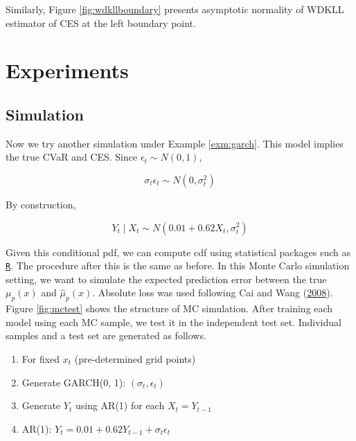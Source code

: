 \documentclass[
]{article}
\providecommand{\tightlist}{%
  \setlength{\itemsep}{0pt}\setlength{\parskip}{0pt}}
\theoremstyle{definition}
\theoremstyle{definition}
\theoremstyle{definition}
\theoremstyle{remark}
\begin{document}
Similarly, Figure \ref{fig:wdkllboundary} presents asymptotic normality of WDKLL estimator of CES at the left boundary point.

\hypertarget{experiment}{%
\section{Experiments}\label{experiment}}

\hypertarget{simulation}{%
\subsection{Simulation}\label{simulation}}

Now we try another simulation under Example \ref{exm:garch}. This model implies the true CVaR and CES. Since \(\epsilon_t \sim N(0, 1)\),

\begin{equation}
  \sigma_t \epsilon_t \sim N(0, \sigma_t^2)
  \label{eq:garchterm}
\end{equation}

By construction,

\begin{equation}
  Y_t \mid X_t \sim N \left( 0.01 + 0.62 X_t, \sigma_t^2 \right)
  \label{eq:arterm}
\end{equation}

Given this conditional pdf, we can compute cdf using statistical packages such as \href{https://www.r-project.org}{\texttt{R}}. The procedure after this is the same as before. In this Monte Carlo simulation setting, we want to simulate the expected prediction error between the true \(\mu_p(x)\) and \(\hat\mu_p(x)\). Absolute loss was used following Cai and Wang (\protect\hyperlink{ref-cai:2008aa}{2008}). Figure \ref{fig:mctest} shows the structure of MC simulation. After training each model using each MC sample, we test it in the independent test set. Individual samples and a test set are generated as follows.

\begin{enumerate}
\def\labelenumi{\arabic{enumi}.}
\tightlist
\item
  For fixed \(x_t\) (pre-determined grid points)
\item
  Generate GARCH(0, 1): \((\sigma_t, \epsilon_t)\)
\item
  Generate \(Y_t\) using AR(1) for each \(X_t = Y_{t - 1}\)
\item
  AR(1): \(Y_t = 0.01 + 0.62 Y_{t - 1} + \sigma_t \epsilon_t\)
\end{enumerate}
\end{document}
